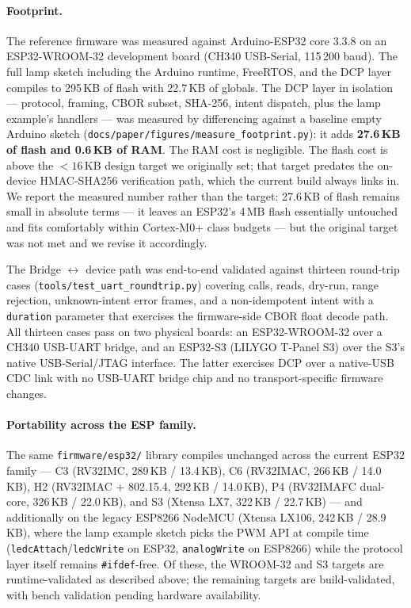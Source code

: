 \documentclass[11pt,a4paper]{article}
\begin{document}
\paragraph{Footprint.} The reference firmware was measured against
Arduino-ESP32 core 3.3.8 on an ESP32-WROOM-32 development board (CH340
USB-Serial, 115\,200 baud). The full lamp sketch including the Arduino
runtime, FreeRTOS, and the DCP layer compiles to 295\,KB of flash with
22.7\,KB of globals. The DCP layer in isolation --- protocol, framing,
CBOR subset, SHA-256, intent dispatch, plus the lamp example's handlers
--- was measured by differencing against a baseline empty Arduino
sketch (\texttt{docs/paper/figures/measure\_footprint.py}): it adds
\textbf{27.6\,KB of flash and 0.6\,KB of RAM}. The RAM cost is
negligible. The flash cost is above the $<\!16$\,KB design target we
originally set; that target predates the on-device HMAC-SHA256
verification path, which the current build always links in. We report
the measured number rather than the target: 27.6\,KB of flash remains
small in absolute terms --- it leaves an ESP32's 4\,MB flash essentially
untouched and fits comfortably within Cortex-M0+ class budgets --- but
the original target was not met and we revise it accordingly.

The Bridge $\leftrightarrow$ device path was end-to-end validated against
thirteen round-trip cases (\texttt{tools/test\_uart\_roundtrip.py}) covering
calls, reads, dry-run, range rejection, unknown-intent error frames, and a
non-idempotent intent with a \texttt{duration} parameter that exercises
the firmware-side CBOR float decode path. All thirteen cases pass on two
physical boards: an ESP32-WROOM-32 over a CH340 USB-UART bridge, and an
ESP32-S3 (LILYGO T-Panel S3) over the S3's native USB-Serial/JTAG
interface. The latter exercises DCP over a native-USB CDC link with no
USB-UART bridge chip and no transport-specific firmware changes.

\paragraph{Portability across the ESP family.} The same
\texttt{firmware/esp32/} library compiles unchanged across the
current ESP32 family --- C3 (RV32IMC, 289\,KB / 13.4\,KB), C6
(RV32IMAC, 266\,KB / 14.0\,KB), H2 (RV32IMAC + 802.15.4, 292\,KB /
14.0\,KB), P4 (RV32IMAFC dual-core, 326\,KB / 22.0\,KB), and S3
(Xtensa LX7, 322\,KB / 22.7\,KB) --- and additionally on the legacy
ESP8266 NodeMCU (Xtensa LX106, 242\,KB / 28.9\,KB), where the lamp
example sketch picks the PWM API at compile time
(\texttt{ledcAttach}/\texttt{ledcWrite} on ESP32, \texttt{analogWrite}
on ESP8266) while the protocol layer itself remains
\texttt{\#ifdef}-free. Of these, the WROOM-32 and S3 targets are
runtime-validated as described above; the remaining targets are
build-validated, with bench validation pending hardware availability.
\end{document}
